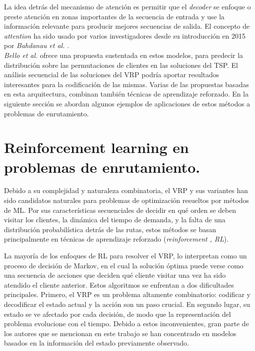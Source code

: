 La idea detrás del mecanismo de atención es permitir que el \textit{decoder} se enfoque o preste atención en zonas importantes de la secuencia de entrada y use la información relevante para producir mejores secuencias de salida. El concepto de \textit{attention} ha sido usado por varios investigadores  \cite{PointerNVinyals, NazariRL, SetAE, OrderMatters} desde su introducción en 2015 por \textit{Bahdanau et al.} \cite{BahdanauAlignTrans}. \\

 \textit{ Bello et al.} \cite{bello2016neural} ofrece una propuesta sustentada en estos modelos, para predecir la distribución sobre las permutaciones de clientes en las soluciones del TSP. El análisis secuencial de las soluciones del VRP podría aportar resultados interesantes para la codificación de las mismas. Varias de las propuestas basadas en esta arquitectura, combinan también técnicas de aprendizaje reforzado. En la siguiente sección se abordan algunos ejemplos de aplicaciones de estos métodos a problemas de enrutamiento. 
 
 
\section{Reinforcement learning en problemas de enrutamiento.}\label{2-RL} 
Debido a su complejidad y naturaleza combinatoria, el VRP y sus variantes han sido candidatos naturales para problemas de optimización resueltos por métodos de ML. Por sus características secuenciales de decidir en qué orden se deben visitar los clientes, la dinámica del tiempo de demanda, y la falta de una distribución probabilística detrás de las rutas, estos métodos se basan principalmente en técnicas de aprendizaje reforzado (\textit{reinforcement , RL}).

La mayoría de los enfoques de RL para resolver el VRP, lo interpretan como un proceso de decisión de Markov, en el cual la solución óptima puede verse como una secuencia de acciones que deciden qué cliente visitar una vez ha sido atendido el cliente anterior. Estos algoritmos se enfrentan a dos dificultades principales. Primero, el VRP es un problema altamente combinatorio: codificar y decodificar el estado actual y la acción son un paso crucial. En segundo lugar, su estado se ve afectado por cada decisión, de modo que la representación del problema evolucione con el tiempo. Debido a estos inconvenientes, gran parte de los autores que se mencionan en este trabajo se han concentrado en modelos basados en la información del estado previamente observado. 

